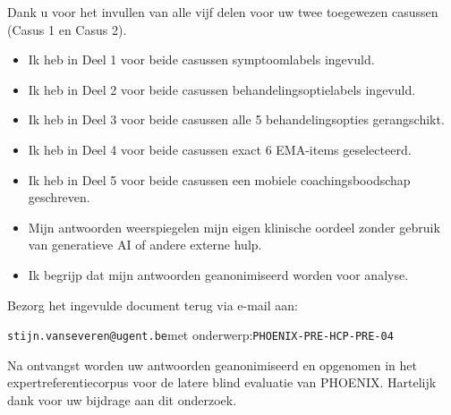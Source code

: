 \documentclass[11pt,a4paper]{article}
\begin{document}
Dank u voor het invullen van alle vijf delen voor uw twee toegewezen casussen
(Casus 1 en Casus 2).

\begin{instrbox}[title=Checklist voor terugbezorging]
\begin{itemize}
\item[$\square$] Ik heb in Deel 1 voor beide casussen symptoomlabels ingevuld.
\item[$\square$] Ik heb in Deel 2 voor beide casussen behandelingsoptielabels ingevuld.
\item[$\square$] Ik heb in Deel 3 voor beide casussen alle 5 behandelingsopties gerangschikt.
\item[$\square$] Ik heb in Deel 4 voor beide casussen exact 6 EMA-items geselecteerd.
\item[$\square$] Ik heb in Deel 5 voor beide casussen een mobiele coachingsboodschap geschreven.
\item[$\square$] Mijn antwoorden weerspiegelen mijn eigen klinische oordeel zonder gebruik van generatieve AI of andere externe hulp.
\item[$\square$] Ik begrijp dat mijn antwoorden geanonimiseerd worden voor analyse.
\end{itemize}
\end{instrbox}

\medskip
Bezorg het ingevulde document terug via e-mail aan:
\begin{center}
\texttt{stijn.vanseveren@ugent.be}\quad met onderwerp:\quad \texttt{PHOENIX-PRE-HCP-PRE-04}
\end{center}

\vspace{0.5em}
\begin{tcolorbox}[colback=AccentBlue,colframe=PrimaryBlue,arc=2mm,boxrule=0.6pt,left=8pt,right=8pt,top=7pt,bottom=7pt]
\small\centering
Na ontvangst worden uw antwoorden geanonimiseerd en opgenomen in het expertreferentiecorpus
voor de latere blind evaluatie van PHOENIX. Hartelijk dank voor uw bijdrage aan dit onderzoek.
\end{tcolorbox}
\end{document}
